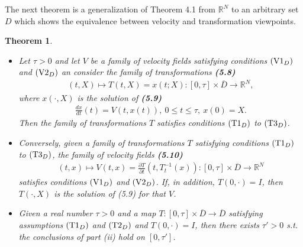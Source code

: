\documentclass{book}
\numberwithin{equation}{section}
\newtheorem{theorem}{Theorem}[section]
\begin{document}
\begin{enumerate}
    The next theorem is a generalization of Theorem 4.1 from $\mathbb{R}^N$ to an arbitrary set $D$ which shows the equivalence between velocity and transformation viewpoints.
    
    \begin{theorem}
        \begin{itemize}
            \item[(i)] Let $\tau > 0$ and let $V$ be a family of velocity fields satisfying conditions $({\rm V1}_D)$ and $({\rm V2}_D)$ an consider the family of transformations \textbf{(5.8)}
            \begin{align*}
                (t,X)\mapsto T(t,X) = x(t;X):[0,\tau]\times\overline{D}\to\mathbb{R}^N,
            \end{align*}
            where $x(\cdot,X)$ is the solution of \textbf{(5.9)}
            \begin{align*}
                \frac{dx}{dt}(t) = V\left(t,x(t)\right),\ 0\le t\le\tau,\ x(0) = X.
            \end{align*}
            Then the family of transformations $T$ satisfies conditions $({\rm T1}_D)$ to $({\rm T3}_D)$.
            \item[(ii)] Conversely, given a family of transformations $T$ satisfying conditions $({\rm T1}_D)$ to $({\rm T3}_D)$, the family of velocity fields \textbf{(5.10)}
            \begin{align*}
                (t,x)\mapsto V(t,x) = \frac{\partial T}{\partial t}\left(t,T_t^{-1}(x)\right):[0,\tau]\times\overline{D}\to\mathbb{R}^N
            \end{align*}
            satisfies conditions $({\rm V1}_D)$ and $({\rm V2}_D)$. If, in addition, $T(0,\cdot) = I$, then $T(\cdot,X)$ is the solution of (5.9) for that $V$.
            \item[(iii)] Given a real number $\tau > 0$ and a map $T:[0,\tau]\times\overline{D}\to\overline{D}$ satisfying assumptions $({\rm T1}_D)$ and $({\rm T2}_D)$ and $T(0,\cdot) = I$, then there exists $\tau' > 0$ s.t. the conclusions of part (ii) hold on $[0,\tau']$.
        \end{itemize}
    \end{theorem}


\end{enumerate}
\end{document}
